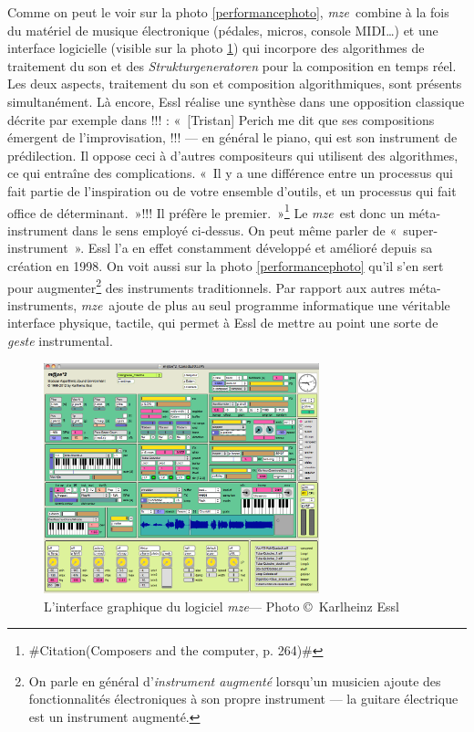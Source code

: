 \documentclass[a4paper,12pt]{article}
\newcommand{\guill}[1]{«~#1~»}
\newcommand{\zitat}[2]{\#Citation(#2)\#}
\newcommand{\maze}[0]{\emph{m\symbol{64}ze\textdegree2}}
\begin{document}
Comme on peut le voir sur la photo \ref{performancephoto}, \maze~combine à la fois du matériel de musique électronique (pédales, micros, console MIDI\dots) et une interface logicielle (visible sur la photo \ref{mazephoto}) qui incorpore des algorithmes de traitement du son et des \emph{Strukturgeneratoren} pour la composition en temps réel. Les deux aspects, traitement du son et composition algorithmiques, sont présents simultanément. Là encore, Essl réalise une synthèse dans une opposition classique décrite par exemple dans !!! : \guill{[Tristan] Perich me dit que ses compositions émergent de l'improvisation, !!! --- en général le piano, qui est son instrument de prédilection. Il oppose ceci à d'autres compositeurs qui utilisent des algorithmes, ce qui entraîne des complications. \guill{Il y a une différence entre un processus qui fait partie de l'inspiration ou de votre ensemble d'outils, et un processus qui fait office de déterminant.}!!! Il préfère le premier.}\footnote{\zitat{[Tristan] Perich tells me that his compositions spring from improvisation, the mind at play --- usually at the piano, which is his main instrument. He constrats this with other composers who use algorithms, which introduce complications. \guill{There's a difference between process being part of the inspiration or the tool set that you have, and process being a determinant.} He prefers the former.}
{Composers and the computer, p. 264}}
Le \maze~est donc un méta-instrument dans le sens employé ci-dessus. On peut même parler de \guill{super-instrument}. Essl l'a en effet constamment développé et amélioré depuis sa création en 1998. On voit aussi sur la photo \ref{performancephoto} qu'il s'en sert pour augmenter\footnote{On parle en général d'\emph{instrument augmenté} lorsqu'un musicien ajoute des fonctionnalités électroniques à son propre instrument --- la guitare électrique est un instrument augmenté.} des instruments traditionnels. Par rapport aux autres méta-instruments, \maze~ajoute de plus au seul programme informatique une véritable interface physique, tactile, qui permet à Essl de mettre au point une sorte de \emph{geste} instrumental.

\begin{figure}[h!]
\begin{center}
\includegraphics[width=8cm]{images/maze.png}
\caption{L'interface graphique du logiciel \maze --- Photo \copyright~Karlheinz Essl}
\label{mazephoto}
\end{center}
\end{figure}
\end{document}
